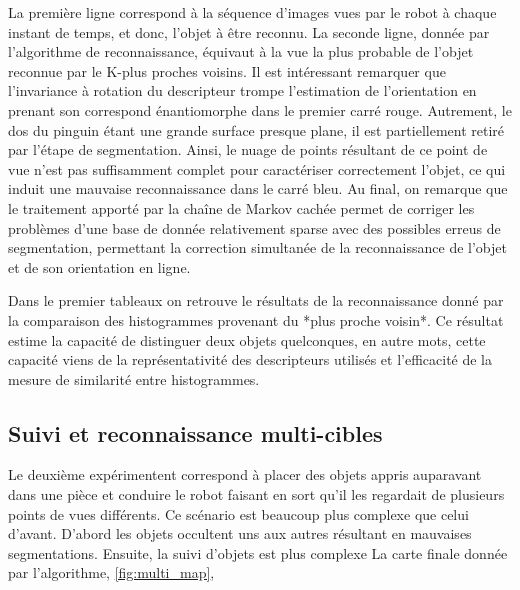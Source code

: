 La première ligne correspond à la séquence d'images vues par le robot à chaque instant de temps, et donc, l'objet à être reconnu. La seconde ligne, donnée par l'algorithme de reconnaissance, équivaut à la vue la plus probable de l'objet reconnue par le K-plus proches voisins. Il est intéressant remarquer que l'invariance à rotation du descripteur trompe l'estimation de l'orientation en prenant son correspond énantiomorphe dans le premier carré rouge. Autrement, le dos du pinguin étant une grande surface presque plane, il est partiellement retiré par l'étape de segmentation. Ainsi, le nuage de points résultant de ce point de vue n'est pas suffisamment complet pour caractériser correctement l'objet, ce qui induit une mauvaise reconnaissance dans le carré bleu. Au final, on remarque que le traitement apporté par la chaîne de Markov cachée permet de corriger les problèmes d'une base de donnée relativement sparse avec des possibles erreus de segmentation, permettant la correction simultanée de la reconnaissance de l'objet et de son orientation en ligne. 



{\color{green}
Dans le premier tableaux on retrouve le résultats de la reconnaissance donné par la comparaison des histogrammes provenant du *plus proche voisin*. Ce résultat estime la capacité de distinguer deux objets quelconques, en autre mots, cette capacité viens de la représentativité des descripteurs utilisés et l'efficacité de la mesure de similarité entre histogrammes.
}


\subsection{Suivi et reconnaissance multi-cibles}

Le deuxième expérimentent correspond à placer des objets appris auparavant dans une pièce et conduire le robot faisant en sort qu'il les regardait de plusieurs points de vues différents. 
Ce scénario est beaucoup plus complexe que celui d'avant. D'abord les objets occultent uns aux autres résultant en mauvaises segmentations. Ensuite, la suivi d'objets est plus complexe
La carte finale donnée par l'algorithme, \ref{fig:multi_map}, 

